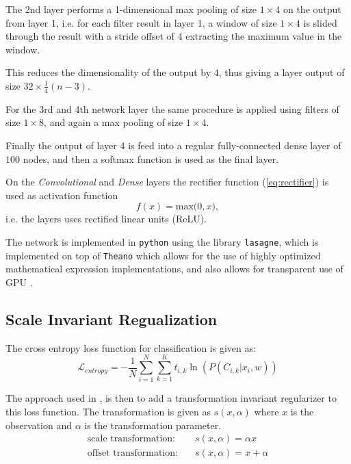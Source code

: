 The 2nd layer performs a 1-dimensional max pooling of size $1 \times 4$ on the output from layer 1, i.e. for each filter result in layer 1, a window of size $1 \times 4$ is slided through the result with a stride offset of $4$ extracting the maximum value in the window.

This reduces the dimensionality of the output by $4$, thus giving a layer output of size $32 \times \frac{1}{4}(n-3)$.

For the 3rd and 4th network layer the same procedure is applied using filters of size $1 \times 8$, and again a max pooling of size $1 \times 4$.

Finally the output of layer 4 is feed into a regular fully-connected dense layer of $100$ nodes, and then a softmax function is used as the final layer.

On the \emph{Convolutional} and \emph{Dense} layers the rectifier function (\cref{eq:rectifier}) is used as activation function
\begin{equation}
  f(x) = \text{max(}0, x\text{)},
  \label{eq:rectifier}
\end{equation}
i.e. the layers uses rectified linear units (ReLU).

The network is implemented in \texttt{python} using the library \texttt{lasagne}, which is implemented on top of \texttt{Theano} which allows for the use of highly optimized mathematical expression implementations, and also allows for transparent use of GPU \cite{theano}.

\subsection{Scale Invariant Regualization}

The cross entropy loss function for classification is given as:
\begin{equation}
\mathcal{L}_{entropy} = - \frac{1}{N} \sum_{i=1}^N \sum_{k=1}^K t_{i,k} \ln(P(C_{i,k} | x_i, w))
\end{equation}

The approach used in \cite{scale-invariante}, is then to add a transformation invariant regularizer to this loss function. The transformation is given as $s(x, \alpha)$ where $x$ is the observation and $\alpha$ is the transformation parameter.
\begin{align}
\text{scale transformation:}&\quad s(x, \alpha) = \alpha x\\
\text{offset transformation:}&\quad s(x, \alpha) = x + \alpha
\end{align}

